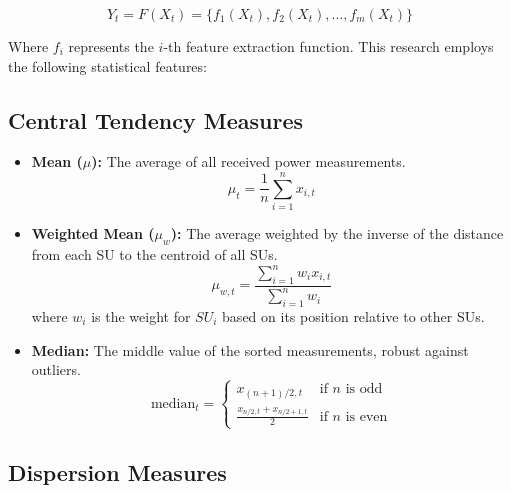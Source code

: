 \begin{equation}
    Y_t = F(X_t) = \{f_1(X_t), f_2(X_t), ..., f_m(X_t)\}
\end{equation}

Where $f_i$ represents the $i$-th feature extraction function. This research employs the following statistical features:

\subsection{Central Tendency Measures}

\begin{itemize}
    \item \textbf{Mean ($\mu$):} The average of all received power measurements.
    \begin{equation}
        \mu_t = \frac{1}{n}\sum_{i=1}^{n}x_{i,t}
    \end{equation}
    
    \item \textbf{Weighted Mean ($\mu_w$):} The average weighted by the inverse of the distance from each SU to the centroid of all SUs.
    \begin{equation}
        \mu_{w,t} = \frac{\sum_{i=1}^{n}w_i x_{i,t}}{\sum_{i=1}^{n}w_i}
    \end{equation}
    where $w_i$ is the weight for $SU_i$ based on its position relative to other SUs.
    
    \item \textbf{Median:} The middle value of the sorted measurements, robust against outliers.
    \begin{equation}
        \text{median}_t = 
        \begin{cases}
            x_{(n+1)/2,t} & \text{if $n$ is odd} \\
            \frac{x_{n/2,t} + x_{n/2+1,t}}{2} & \text{if $n$ is even}
        \end{cases}
    \end{equation}
\end{itemize}

\subsection{Dispersion Measures}

